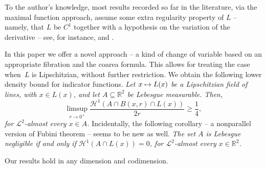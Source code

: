 \documentclass[JEP,XML,SOM,Unicode,ThmDefs,NoEqCountersInSection]{cedram}
\newcommand\mto{\mathchoice{\longmapsto}{\mapsto}{\mapsto}{\mapsto}}
\newcommand{\R}{\mathbb{R}}
\newcommand{\calH}{\mathscr{H}}
\newcommand{\calL}{\mathscr{L}}
\let\subset\subseteq
\begin{document}
To the author's knowledge, most results recorded so far in the literature, via the maximal function approach, assume some extra regularity property of $L$ -- namely, that $L$ be $C^1$ together with a hypothesis on the variation of the derivative -- see, for instance, \cite{BOU.89} and \cite{LAC.LI.10}.
\par
In this paper we offer a novel approach -- a kind of change of variable based on an appropriate fibration and the coarea formula.
This allows for treating the case when~$L$ is Lipschitzian, without further restriction.
We obtain the following lower density bound for indicator functions.
{\it
Let $x \mto L(x)$ be a Lipschitzian field of lines, with $x \in L(x)$, and let $A \subset \R^2$ be Lebesgue measurable.
Then,\vspace*{-3pt}
\begin{equation*}
\limsup_{r \to 0^+} \frac{\calH^1(A \cap B(x,r)\cap L(x))}{2r} \geq \frac{1}{4},
\end{equation*}
for $\calL^2$-almost every $x \in A$.
}
Incidentally, the following corollary -- a nonparallel version of Fubini theorem -- seems to be new as well.
{\it
The set $A$ is Lebesgue negligible if and only if $\calH^1(A \cap L(x))=0$, for $\calL^2$-almost every $x \in \R^2$.
}
\par
Our results hold in any dimension and codimension.

\nocite{BRU.71}
\end{document}
